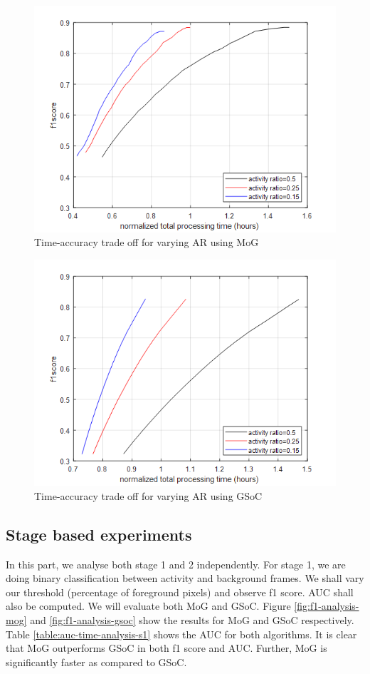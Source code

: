 \begin{figure}
    \centering
    \includegraphics[width=\linewidth]{images/time-acc-tradeoff-ar-mog.png}
    \caption{Time-accuracy trade off for varying AR using MoG}
    \label{fig:time-acc-tradeoff-ar-mog}
\end{figure}

\begin{figure}
    \centering
    \includegraphics[width=\linewidth]{images/time-acc-tradeoff-ar-gsoc.png}
    \caption{Time-accuracy trade off for varying AR using GSoC}
    \label{fig:time-acc-tradeoff-ar-gsoc}
\end{figure}


\subsection{Stage based experiments}
In this part, we analyse both stage 1 and 2 independently. For stage 1, we are doing binary classification between activity and background frames. We shall vary our threshold (percentage of foreground pixels) and observe f1 score. AUC shall also be computed. We will evaluate both MoG and GSoC. Figure \ref{fig:f1-analysis-mog} and \ref{fig:f1-analysis-gsoc} show the results for MoG and GSoC respectively. Table \ref{table:auc-time-analysis-s1} shows the AUC for both algorithms. It is clear that MoG outperforms GSoC in both f1 score and AUC. Further, MoG is significantly faster as compared to GSoC.   

